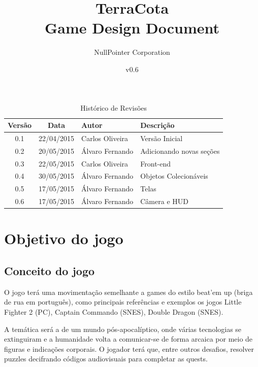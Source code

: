 \documentclass[12pt]{article}
\begin{document}
\title{TerraCota\\Game Design Document}
\author{NullPointer Corporation}
\date{v0.6}
\maketitle

\newpage

\begin{table}[h]
  \centering
  \begin{tabular}{ccll}
    \toprule
    \textbf{Versão} & \textbf{Data} & \textbf{Autor} & \textbf{Descrição} \\
    \midrule
    0.1 & 22/04/2015 & Carlos Oliveira  & Versão Inicial \\
    \rowcolor[gray]{0.9}
    0.2 & 20/05/2015 & Álvaro Fernando & Adicionando novas seções \\
    0.3 & 22/05/2015 & Carlos Oliveira & Front-end \\
    \rowcolor[gray]{0.9}
    0.4 & 30/05/2015 & Álvaro Fernando & Objetos Colecionáveis \\
    0.5 & 17/05/2015 & Álvaro Fernando & Telas \\
    \rowcolor[gray]{0.9}
    0.6 & 17/05/2015 & Álvaro Fernando & Câmera e HUD \\
    \bottomrule
  \end{tabular}
  \caption{Histórico de Revisões}
\end{table}

\newpage

\tableofcontents

\newpage

\listoffigures

\newpage
\section{Objetivo do jogo}

\subsection{Conceito do jogo}
O jogo terá uma movimentação semelhante a games do estilo beat'em up (briga de
rua em português), como principais referências e exemplos os jogos Little
Fighter 2 (PC), Captain Commando (SNES), Double Dragon (SNES).

A temática será a de um mundo pós-apocalíptico, onde várias tecnologias se
extinguiram e a humanidade volta a comunicar-se de forma arcaica por meio de
figuras e indicações corporais. O jogador terá que, entre outros desafios,
resolver puzzles decifrando códigos audiovisuais para completar as quests.
\end{document}
